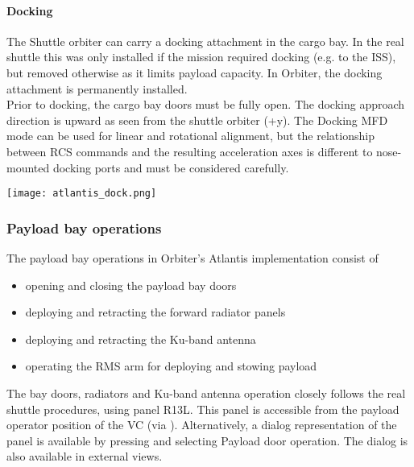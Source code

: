 \documentclass[Orbiter User Manual.tex]{subfiles}
\begin{document}
\paragraph{Docking}
The Shuttle orbiter can carry a docking attachment in the cargo bay. In the real shuttle this was only installed if the mission required docking (e.g. to the ISS), but removed otherwise as it limits payload capacity. In Orbiter, the docking attachment is permanently installed.\\

Prior to docking, the cargo bay doors must be fully open. The docking approach direction is upward as seen from the shuttle orbiter (+y). The Docking MFD mode can be used for linear and rotational alignment, but the relationship between RCS commands and the resulting acceleration axes is different to nose-mounted docking ports and must be considered carefully.

\begin{center}
\texttt{[image: atlantis\_dock.png]}
\end{center}

\subsubsection{Payload bay operations}

The payload bay operations in Orbiter's Atlantis implementation consist of
\begin{itemize}
\item opening and closing the payload bay doors
\item deploying and retracting the forward radiator panels
\item deploying and retracting the Ku-band antenna
\item operating the RMS arm for deploying and stowing payload
\end{itemize}

\noindent
The bay doors, radiators and Ku-band antenna operation closely follows the real shuttle procedures, using panel R13L. This panel is accessible from the payload operator position of the VC (via \keystroke{$\leftarrow$}). Alternatively, a dialog representation of the panel is available by pressing  and selecting Payload door operation. The dialog is also available in external views.
\end{document}
